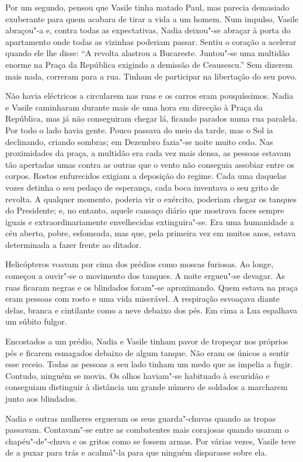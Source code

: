 Por um segundo, pensou que Vasile tinha matado Paul, mas parecia
demasiado exuberante para quem acabara de tirar a vida a um homem. Num
impulso, Vasile abraçou"-a e, contra todas as expectativas, Nadia
deixou"-se abraçar à porta do apartamento onde todas as vizinhas poderiam
passar. Sentiu o coração a acelerar quando ele lhe disse:
``A revolta alastrou a Bucareste. Juntou"-se uma multidão enorme na Praça
da República exigindo a demissão de
Ceausescu.'' Sem dizerem mais nada, correram para a rua. Tinham de
participar na libertação do seu povo.

Não havia eléctricos a circularem nas ruas e os carros eram
pouquíssimos. Nadia e Vasile caminharam durante mais de uma hora em
direcção à Praça da República, mas já não conseguiram chegar lá, ficando
parados numa rua paralela. Por todo o lado havia gente. Pouco passava do
meio da tarde, mas o Sol ia declinando, criando sombras; em Dezembro
fazia"-se noite muito cedo. Nas proximidades da praça, a multidão era
cada vez mais densa, as pessoas estavam tão apertadas umas contra as
outras que o vento não conseguia assobiar entre os corpos. Rostos
enfurecidos exigiam a deposição do regime. Cada uma daquelas vozes
detinha o seu pedaço de esperança, cada boca inventava o seu grito de
revolta. A qualquer momento, poderia vir o exército, poderiam chegar
os tanques do Presidente; e, no entanto, aquele cansaço diário que
mostrava faces sempre iguais e extraordinariamente envelhecidas
extinguira"-se. Era uma humanidade a céu aberto, pobre, esfomeada, mas
que, pela primeira vez em muitos anos, estava determinada a fazer frente
ao ditador.

Helicópteros voavam por cima dos prédios como moscas furiosas. Ao longe, começou a ouvir"-se o movimento dos tanques. A
noite ergueu"-se devagar. As ruas ficaram negras e os blindados foram"-se
aproximando. Quem estava na praça eram pessoas com rosto e uma vida
miserável. A respiração esvoaçava diante delas, branca e cintilante como
a neve debaixo dos pés. Em cima a Lua espalhava um súbito fulgor.


Encostados a um prédio, Nadia e Vasile tinham pavor de tropeçar nos
próprios pés e ficarem esmagados debaixo de algum tanque. Não eram os
únicos a sentir esse receio. Todas as pessoas a seu lado tinham um medo
que as impelia a fugir. Contudo, ninguém se movia. Os olhos haviam"-se
habituado à escuridão e conseguiam distinguir à distância um grande
número de soldados a marcharem junto aos blindados.

Nadia e outras mulheres ergueram os seus guarda"-chuvas quando as tropas passavam. Contavam"-se entre as combatentes mais
corajosas quando usaram o chapéu"-de"-chuva e os gritos como se fossem armas. Por várias vezes, Vasile teve
de a puxar para trás e acalmá"-la para que ninguém disparasse sobre
ela.

